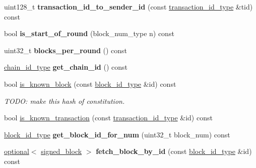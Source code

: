 \begin{DoxyCompactItemize}
uint128\+\_\+t {\bfseries transaction\+\_\+id\+\_\+to\+\_\+sender\+\_\+id} (const \mbox{\hyperlink{classfc_1_1sha256}{transaction\+\_\+id\+\_\+type}} \&tid) const
\item 
\mbox{\label{classaacio_1_1chain_1_1chain__controller_a8d6a9698967c9c71b67bfba3d5e61c35}} 
bool {\bfseries is\+\_\+start\+\_\+of\+\_\+round} (block\+\_\+num\+\_\+type n) const
\item 
\mbox{\label{classaacio_1_1chain_1_1chain__controller_a009bb9bce0ba141d9034cf9e0e670c26}} 
uint32\+\_\+t {\bfseries blocks\+\_\+per\+\_\+round} () const
\item 
\mbox{\label{classaacio_1_1chain_1_1chain__controller_aaba7f1550dff1ed9e870fa6e05386d38}} 
\mbox{\hyperlink{classfc_1_1sha256}{chain\+\_\+id\+\_\+type}} {\bfseries get\+\_\+chain\+\_\+id} () const
\item 
bool \mbox{\hyperlink{classaacio_1_1chain_1_1chain__controller_a6bbdca183ddca90d147fc95e1d27cfed}{is\+\_\+known\+\_\+block}} (const \mbox{\hyperlink{classfc_1_1sha256}{block\+\_\+id\+\_\+type}} \&id) const
\begin{DoxyCompactList}\small\item\em T\+O\+DO\+: make this hash of constitution. \end{DoxyCompactList}\item 
bool \mbox{\hyperlink{classaacio_1_1chain_1_1chain__controller_a5fe603a309127c8b195a55b0706d2235}{is\+\_\+known\+\_\+transaction}} (const \mbox{\hyperlink{classfc_1_1sha256}{transaction\+\_\+id\+\_\+type}} \&id) const
\item 
\mbox{\label{classaacio_1_1chain_1_1chain__controller_a2c9e4e974bc3c6100bdeced388c0d9cb}} 
\mbox{\hyperlink{classfc_1_1sha256}{block\+\_\+id\+\_\+type}} {\bfseries get\+\_\+block\+\_\+id\+\_\+for\+\_\+num} (uint32\+\_\+t block\+\_\+num) const
\item 
\mbox{\label{classaacio_1_1chain_1_1chain__controller_a92c45a50fd960bb747f3ef9af8d9e65a}} 
\mbox{\hyperlink{classfc_1_1optional}{optional}}$<$ \mbox{\hyperlink{structaacio_1_1chain_1_1signed__block}{signed\+\_\+block}} $>$ {\bfseries fetch\+\_\+block\+\_\+by\+\_\+id} (const \mbox{\hyperlink{classfc_1_1sha256}{block\+\_\+id\+\_\+type}} \&id) const

\end{DoxyCompactItemize}
